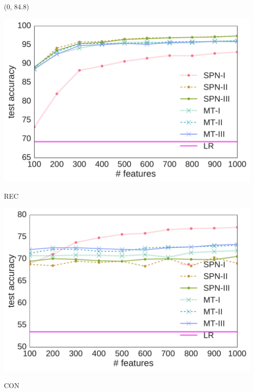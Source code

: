 \documentclass[final]{beamer}
\begin{document}
\begin{frame}{}
  \begin{textblock}{80}(0, 84.8)
    \begin{center}
      \begin{minipage}[t]{0.2\linewidth}
        \begin{center}
          \includegraphics[width=1.0\linewidth]{figures/lines-rectangles}\par
          \footnotesize\textsf{REC}
        \end{center}
      \end{minipage}\begin{minipage}[t]{0.2\linewidth}
        \begin{center}
          \includegraphics[width=1.0\linewidth]{figures/lines-convex}\par
          \footnotesize\textsf{CON}
        \end{center}
      \end{minipage}\begin{minipage}[t]{0.2\linewidth}

\end{minipage}
\end{center}
\end{textblock}
\end{frame}
\end{document}
